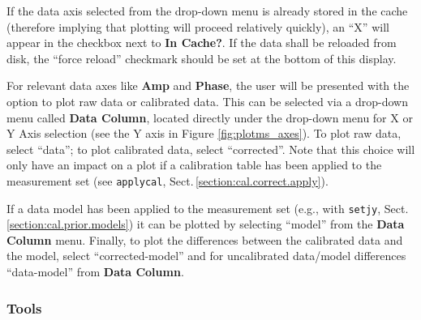 If the data axis selected from the drop-down menu is already stored in
the cache (therefore implying that plotting will proceed relatively
quickly), an ``X'' will appear in the checkbox next to {\bf In
  Cache?}. If the data shall be reloaded from disk, the ``force
reload'' checkmark should be set at the bottom of this display. 



For relevant data axes like {\bf Amp} and {\bf Phase}, the user will
be presented with the option to plot raw data or calibrated data. This
can be selected via a drop-down menu called {\bf Data Column}, located
directly under the drop-down menu for X or Y Axis selection (see the Y
axis in Figure \ref{fig:plotms_axes}). To plot raw data, select
``data''; to plot calibrated data, select ``corrected''. Note that
this choice will only have an impact on a plot if a calibration table
has been applied to the measurement set (see {\tt applycal},
Sect.\,\ref{section:cal.correct.apply}).

If a data model has been applied to the measurement set (e.g., with
{\tt setjy}, Sect.\,\ref{section:cal.prior.models}) it can be plotted
by selecting ``model'' from the {\bf Data Column} menu. Finally, to
plot the differences between the calibrated data and the model, select
``corrected-model'' and for uncalibrated data/model differences
``data-model'' from {\bf Data Column}.


\subsubsection{Tools}
\label{section:edit.plot.plotms.tools}

